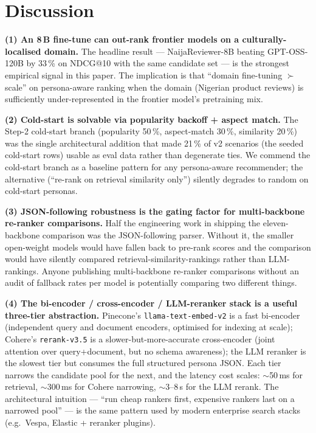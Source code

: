 \documentclass[sigconf,nonacm,balance]{acmart}
\begin{document}
\section{Discussion}
\label{sec:discussion}

\textbf{(1) An 8\,B fine-tune can out-rank frontier models on a culturally-localised
domain.} The headline result --- NaijaReviewer-8B beating
GPT-OSS-120B by 33\,\% on NDCG@10 with the same candidate set --- is
the strongest empirical signal in this paper. The implication is that
``domain fine-tuning $\succ$ scale'' on persona-aware ranking when
the domain (Nigerian product reviews) is sufficiently under-represented
in the frontier model's pretraining mix.

\textbf{(2) Cold-start is solvable via popularity backoff + aspect match.}
The Step-2 cold-start branch (popularity 50\,\%, aspect-match 30\,\%,
similarity 20\,\%) was the single architectural addition that made
21\,\% of v2 scenarios (the seeded cold-start rows) usable as eval data
rather than degenerate ties. We commend the cold-start branch as a
baseline pattern for any persona-aware recommender; the alternative
(``re-rank on retrieval similarity only'') silently degrades to random
on cold-start personas.

\textbf{(3) JSON-following robustness is the gating factor for multi-backbone
re-ranker comparisons.} Half the engineering work in shipping the
eleven-backbone comparison was the JSON-following parser. Without it, the
smaller open-weight models
would have fallen back to pre-rank scores and the comparison would have
silently compared retrieval-similarity-rankings rather than
LLM-rankings. Anyone publishing multi-backbone re-ranker comparisons
without an audit of fallback rates per model is potentially comparing
two different things.

\textbf{(4) The bi-encoder / cross-encoder / LLM-reranker stack is
a useful three-tier abstraction.} Pinecone's
\texttt{llama-text-embed-v2} is a fast bi-encoder (independent query
and document encoders, optimised for indexing at scale); Cohere's
\texttt{rerank-v3.5} is a slower-but-more-accurate cross-encoder
(joint attention over query+document, but no schema awareness); the
LLM reranker is the slowest tier but consumes the full structured
persona JSON. Each tier narrows the candidate pool for the next, and
the latency cost scales: $\sim$50\,ms for retrieval, $\sim$300\,ms
for Cohere narrowing, $\sim$3--8\,s for the LLM rerank. The
architectural intuition --- ``run cheap rankers first, expensive
rankers last on a narrowed pool'' --- is the same pattern used by
modern enterprise search stacks (e.g.\ Vespa, Elastic + reranker
plugins).
\end{document}
